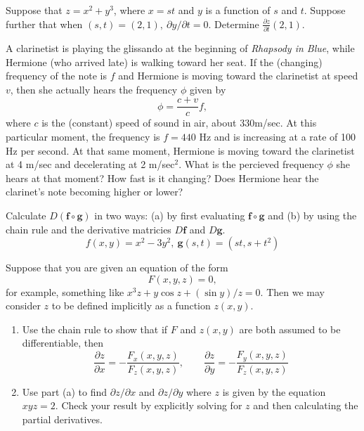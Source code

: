 \documentclass[12pt,letterpaper]{hmcpset}
\newcommand{\vb}{\mathbf}
\begin{document}

\begin{problem}[Colley 2.5.4]
  Suppose that $z = x^2 + y^3$, where $x = st$ and $y$ is a function of $s$ and $t$.
  Suppose further that when $(s,t) = (2,1),~\partial y/\partial t = 0$.
  Determine $\displaystyle \frac{\partial z}{\partial t}(2, 1)$.
\end{problem}
\clearpage

\begin{problem}[Colley 2.5.10]
  A clarinetist is playing the glissando at the beginning of
  \textit{Rhapsody in Blue}, while Hermione (who arrived late)
  is walking toward her seat.
  If the (changing) frequency of the note is $f$ and Hermione is moving toward the clarinetist at speed $v$, then she actually hears the frequency $\phi$ given by
  \[ \phi = \frac{c + v}{c}f, \]
  where $c$ is the (constant) speed of sound in air, about 330m/sec.
  At this particular moment, the frequency is $f = 440$ Hz and is increasing at a rate of 100 Hz per second.
  At that same moment, Hermione is moving toward the clarinetist at 4 m/sec and decelerating at 2 m/sec$^2$.
  What is the percieved frequency $\phi$ she hears at that moment?
  How fast is it changing?
  Does Hermione hear the clarinet's note becoming higher or lower?
\end{problem}
\clearpage

\begin{problem}[Colley 2.5.22]
  Calculate $D(\vb f \circ \vb g)$ in two ways:
  (a) by first evaluating $\vb f \circ \vb g$ and
  (b) by using the chain rule and the derivative matricies $D\vb f$ and $D\vb g$.
  \[ f(x,y) = x^2 - 3y^2,~\vb g(s, t) = (st, s+t^2) \]
\end{problem}
\clearpage

\begin{problem}[Colley 2.5.36]
  Suppose that you are given an equation of the form
  \[ F(x,y,z) = 0, \]
  for example, something like $x^3z + y\cos z + (\sin y)/z = 0$.
  Then we may consider $z$ to be defined implicitly as a function $z(x, y)$.
  \begin{enumerate}[label=(\alph*)]
  \item Use the chain rule to show that if $F$ and $z(x,y)$ are both assumed to be differentiable, then
    \[\frac{\partial z}{\partial x} = -\frac{F_x(x,y,z)}{F_z(x,y,z)},\qquad \frac{\partial z}{\partial y} = -\frac{F_y(x,y,z)}{F_z(x,y,z)} \]
  \item Use part (a) to find $\partial z/\partial x$ and $\partial z / \partial y$ where $z$ is given by the equation $xyz = 2$.
    Check your result by explicitly solving for $z$ and then calculating the partial derivatives.
  \end{enumerate}
\end{problem}
\clearpage
\end{document}
